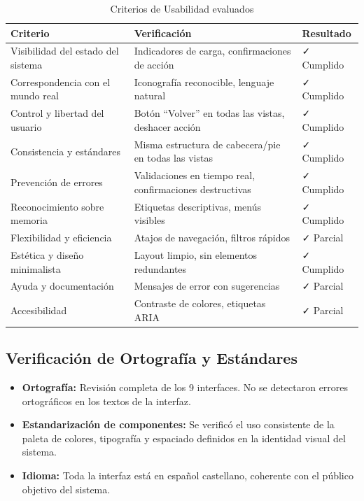 \begin{table}[H]
    \centering
    \caption{Criterios de Usabilidad evaluados}
    \label{tab:criterios_usabilidad}
    \begin{tabular}{|>{\raggedright\arraybackslash}p{}|>{\raggedright\arraybackslash}p{}|>{\raggedright\arraybackslash}p{}|}
        \hline
        \textbf{Criterio} & \textbf{Verificación} & \textbf{Resultado} \\
        \hline
        Visibilidad del estado del sistema & Indicadores de carga, confirmaciones de acción & ✓ Cumplido \\
        \hline
        Correspondencia con el mundo real & Iconografía reconocible, lenguaje natural & ✓ Cumplido \\
        \hline
        Control y libertad del usuario & Botón ``Volver'' en todas las vistas, deshacer acción & ✓ Cumplido \\
        \hline
        Consistencia y estándares & Misma estructura de cabecera/pie en todas las vistas & ✓ Cumplido \\
        \hline
        Prevención de errores & Validaciones en tiempo real, confirmaciones destructivas & ✓ Cumplido \\
        \hline
        Reconocimiento sobre memoria & Etiquetas descriptivas, menús visibles & ✓ Cumplido \\
        \hline
        Flexibilidad y eficiencia & Atajos de navegación, filtros rápidos & ✓ Parcial \\
        \hline
        Estética y diseño minimalista & Layout limpio, sin elementos redundantes & ✓ Cumplido \\
        \hline
        Ayuda y documentación & Mensajes de error con sugerencias & ✓ Parcial \\
        \hline
        Accesibilidad & Contraste de colores, etiquetas ARIA & ✓ Parcial \\
        \hline
    \end{tabular}
\end{table}

\subsection{Verificación de Ortografía y Estándares}

\begin{itemize}
    \item \textbf{Ortografía:} Revisión completa de los 9 interfaces. No se detectaron errores ortográficos en los textos de la interfaz.
    \item \textbf{Estandarización de componentes:} Se verificó el uso consistente de la paleta de colores, tipografía y espaciado definidos en la identidad visual del sistema.
    \item \textbf{Idioma:} Toda la interfaz está en español castellano, coherente con el público objetivo del sistema.
\end{itemize}


